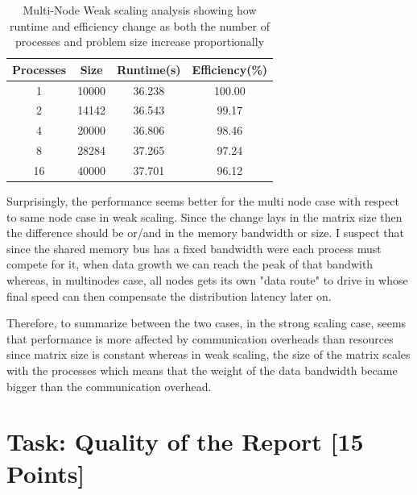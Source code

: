 \documentclass[unicode,11pt,a4paper,oneside,numbers=endperiod,openany]{scrartcl}
\begin{document}
\begin{table}[h!]
\centering
\begin{tabular}{|c|c|c|c|}
\hline
Processes & Size & Runtime(s) & Efficiency(\%) \\
\hline
1 & 10000 & 36.238 & 100.00 \\
2 & 14142 & 36.543 & 99.17 \\
4 & 20000 & 36.806 & 98.46 \\
8 & 28284 & 37.265 & 97.24 \\
16 & 40000 & 37.701 & 96.12 \\
\hline
\end{tabular}
\caption{Multi-Node Weak scaling analysis showing how runtime and efficiency change as both the number of processes and problem size increase proportionally}
\end{table}

Surprisingly, the performance seems better for the multi node case with respect to same node case in weak scaling. 
Since the change lays in the matrix size then the difference should be or/and in the memory bandwidth or size. I suspect that since the 
shared memory bus has a fixed bandwidth were each process must compete for it, when data growth we can reach the peak of that bandwith 
whereas, in multinodes case, all nodes gets its own "data route" to drive in whose final speed can then compensate the distribution latency
later on.  

Therefore, to summarize between the two cases, in the strong scaling case, seems that performance is more affected by communication overheads than resources
since matrix size is constant whereas in weak scaling, the size of the matrix scales with the processes which means that the weight of the data bandwidth
became bigger than the communication overhead. 


\section{Task:  Quality of the Report [15 Points]}
\end{document}
